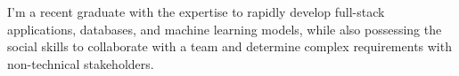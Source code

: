 \documentclass[letter,10pt]{article}
\begin{document}
\def\introstatement{I'm a recent graduate with the expertise to rapidly develop full-stack applications, databases, and machine learning models, while also possessing the social skills to collaborate with a team and determine complex requirements with non-technical stakeholders.}

\begin{flushleft}
    \introstatement{}
\end{flushleft}
\end{document}
